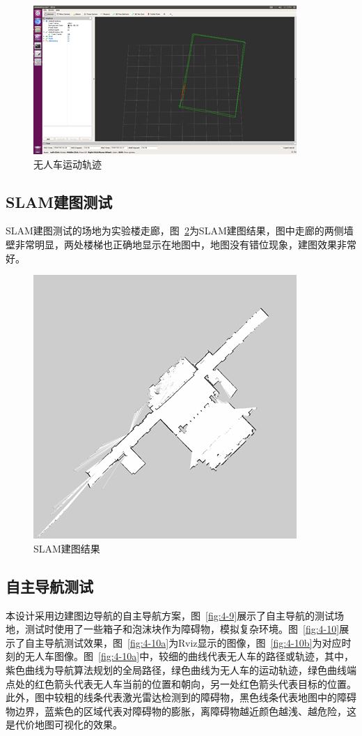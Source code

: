 \begin{figure}[htb]
	\centering
	\includegraphics[width=0.6\linewidth]{figures/4-7.png}
	\caption{无人车运动轨迹}
	\label{fig:4-7}
\end{figure}

\subsection{SLAM建图测试}
SLAM建图测试的场地为实验楼走廊，图~\ref{fig:4-8}为SLAM建图结果，图中走廊的两侧墙壁非常明显，两处楼梯也正确地显示在地图中，地图没有错位现象，建图效果非常好。

\begin{figure}[htb]
	\centering
	\includegraphics[width=0.6\linewidth]{figures/4-8.png}
	\caption{SLAM建图结果}
	\label{fig:4-8}
\end{figure}

\subsection{自主导航测试}
本设计采用边建图边导航的自主导航方案，图~\ref{fig:4-9}展示了自主导航的测试场地，测试时使用了一些箱子和泡沫块作为障碍物，模拟复杂环境。图~\ref{fig:4-10}展示了自主导航测试效果，图~\ref{fig:4-10a}为Rviz显示的图像，图~\ref{fig:4-10b}为对应时刻的无人车图像。图~\ref{fig:4-10a}中，较细的曲线代表无人车的路径或轨迹，其中，紫色曲线为导航算法规划的全局路径，绿色曲线为无人车的运动轨迹，绿色曲线端点处的红色箭头代表无人车当前的位置和朝向，另一处红色箭头代表目标的位置。此外，图中较粗的线条代表激光雷达检测到的障碍物，黑色线条代表地图中的障碍物边界，蓝紫色的区域代表对障碍物的膨胀，离障碍物越近颜色越浅、越危险，这是代价地图可视化的效果。

